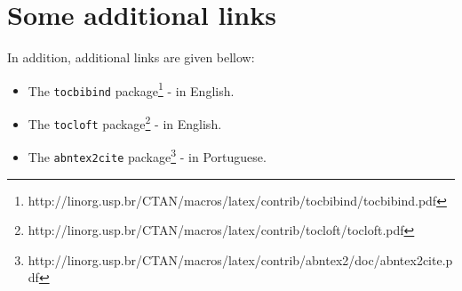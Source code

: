 \section{Some additional links}

In addition, additional links are given bellow:

\begin{itemize}
    \item The \texttt{tocbibind}
package\footnote{http://linorg.usp.br/CTAN/macros/latex/contrib/tocbibind/tocbibind.pdf} - in English.
    \item The \texttt{tocloft}
package\footnote{http://linorg.usp.br/CTAN/macros/latex/contrib/tocloft/tocloft.pdf} - in English.
    \item The \texttt{abntex2cite} package\footnote{http://linorg.usp.br/CTAN/macros/latex/contrib/abntex2/doc/abntex2cite.pdf} - in Portuguese.

\end{itemize}